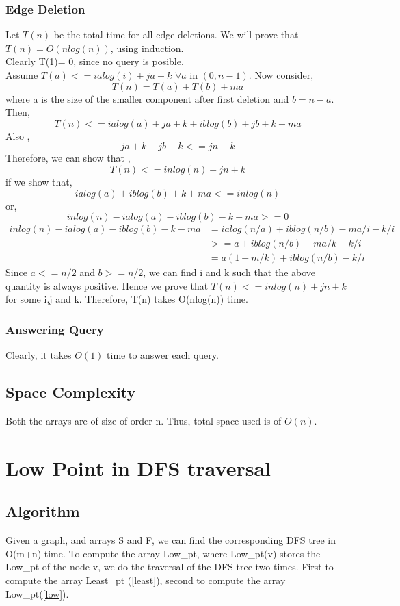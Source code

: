 \documentclass{article}
\begin{document}
\subsubsection{Edge Deletion}
Let $T(n)$ be the total time for all edge deletions. We will prove that $T(n)=O(nlog(n))$, using induction. \\
Clearly T(1)= 0, since no query is posible. \\ Assume $T(a) <= ialog(i)+ja+k$ $\forall a$ in $(0,n-1)$.  Now consider,
$$ T(n) = T(a) + T(b) + ma $$  where a is the size of the smaller component after first deletion and $b=n-a$. Then,
$$ T(n) <= ialog(a) + ja+k+iblog(b)+jb+k + ma $$ 
Also , $$ja+k+jb+k <= jn+k$$
Therefore, we can show that ,$$T(n) <= inlog(n)+jn+k$$
if we show that, $$ialog(a)+iblog(b)+k+ma <= inlog(n) $$
or, $$inlog(n)- ialog(a)-iblog(b)-k-ma >=0 $$
\begin{align*}
inlog(n)- ialog(a)-iblog(b)-k-ma &= ialog(n/a)+iblog(n/b)-ma/i-k/i \\
& >= a+ iblog(n/b)-ma/k-k/i\\
& = a(1-m/k) + iblog(n/b)-k/i
\end{align*}
Since $a<=n/2$ and $b>=n/2$, we can find i and k such that the above quantity is always positive. Hence we prove that $T(n)<=inlog(n)+jn+k$ for some i,j and k. Therefore, T(n) takes O(nlog(n)) time.
\subsubsection{Answering Query}
Clearly, it takes $O(1)$ time to answer each query.
\subsection{Space Complexity}
Both the arrays are of size of order n. Thus, total space used is of $O(n)$.

\section{Low Point in DFS traversal}

\subsection{Algorithm}
Given a graph, and arrays S and F, we can find the corresponding DFS tree in O(m+n) time. To compute the array Low\_pt, where Low\_pt(v) stores the Low\_pt of the node v, we do the traversal of the DFS tree two times. First to compute the array Least\_pt (\ref{least}), second to compute the array Low\_pt(\ref{low}).
\end{document}
